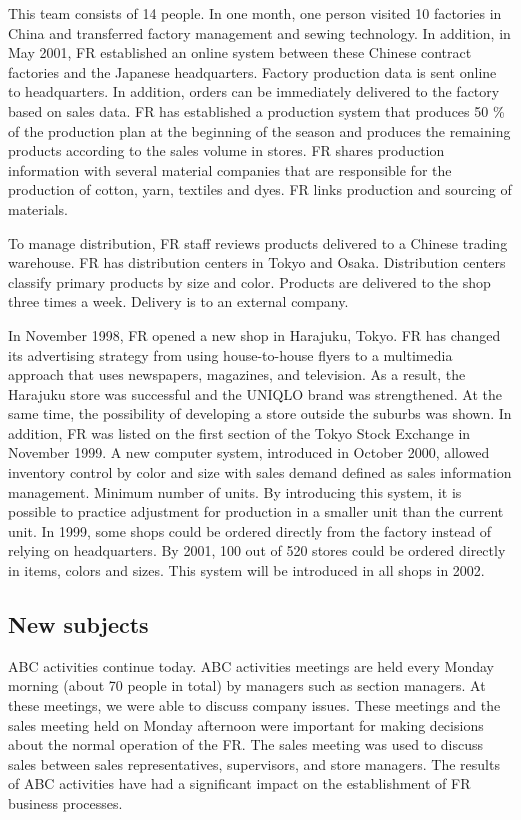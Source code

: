 \documentclass[12pt,]{article}
\begin{document}
This team consists of 14 people. In one month, one person visited 10
factories in China and transferred factory management and sewing
technology. In addition, in May 2001, FR established an online system
between these Chinese contract factories and the Japanese headquarters.
Factory production data is sent online to headquarters. In addition,
orders can be immediately delivered to the factory based on sales data.
FR has established a production system that produces 50 \% of the
production plan at the beginning of the season and produces the
remaining products according to the sales volume in stores. FR shares
production information with several material companies that are
responsible for the production of cotton, yarn, textiles and dyes. FR
links production and sourcing of materials.

To manage distribution, FR staff reviews products delivered to a Chinese
trading warehouse. FR has distribution centers in Tokyo and Osaka.
Distribution centers classify primary products by size and color.
Products are delivered to the shop three times a week. Delivery is to an
external company.

In November 1998, FR opened a new shop in Harajuku, Tokyo. FR has
changed its advertising strategy from using house-to-house flyers to a
multimedia approach that uses newspapers, magazines, and television. As
a result, the Harajuku store was successful and the UNIQLO brand was
strengthened. At the same time, the possibility of developing a store
outside the suburbs was shown. In addition, FR was listed on the first
section of the Tokyo Stock Exchange in November 1999. A new computer
system, introduced in October 2000, allowed inventory control by color
and size with sales demand defined as sales information management.
Minimum number of units. By introducing this system, it is possible to
practice adjustment for production in a smaller unit than the current
unit. In 1999, some shops could be ordered directly from the factory
instead of relying on headquarters. By 2001, 100 out of 520 stores could
be ordered directly in items, colors and sizes. This system will be
introduced in all shops in 2002.

\hypertarget{new-subjects}{%
\subsection{New subjects}\label{new-subjects}}

ABC activities continue today. ABC activities meetings are held every
Monday morning (about 70 people in total) by managers such as section
managers. At these meetings, we were able to discuss company issues.
These meetings and the sales meeting held on Monday afternoon were
important for making decisions about the normal operation of the FR. The
sales meeting was used to discuss sales between sales representatives,
supervisors, and store managers. The results of ABC activities have had
a significant impact on the establishment of FR business processes.
\end{document}
